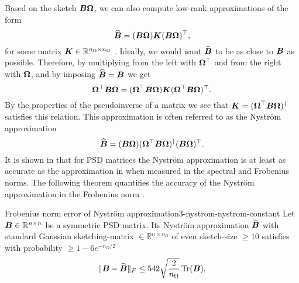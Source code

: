 Based on the sketch $\boldsymbol{B}\boldsymbol{\Omega}$, we can also compute low-rank approximations
of the form
\begin{equation}
    \widehat{\boldsymbol{B}} = (\boldsymbol{B} \boldsymbol{\Omega}) \boldsymbol{K} (\boldsymbol{B} \boldsymbol{\Omega})^{\top},
    \label{equ:3-nystrom-nystrom-general}
\end{equation}
for some matrix $\boldsymbol{K} \in \mathbb{R}^{n_{\Omega} \times n_{\Omega}}$ \cite[section~3.1]{lin2017randomized}.
Ideally, we would want $\widehat{\boldsymbol{B}}$ to be as close to $\boldsymbol{B}$ as possible. Therefore, by multiplying 
from the left with $\boldsymbol{\Omega}^{\top}$ and from the right with $\boldsymbol{\Omega}$,
and by imposing $\widehat{\boldsymbol{B}} = \boldsymbol{B}$ we get
\begin{equation}
    \boldsymbol{\Omega}^{\top} \boldsymbol{B} \boldsymbol{\Omega} = (\boldsymbol{\Omega}^{\top} \boldsymbol{B} \boldsymbol{\Omega}) \boldsymbol{K} (\boldsymbol{\Omega}^{\top} \boldsymbol{B} \boldsymbol{\Omega})^{\top}.
    \label{equ:3-nystrom-nystrom-unknown}
\end{equation}
By the properties of the pseudoinverse of a matrix we see that
$\boldsymbol{K} = (\boldsymbol{\Omega}^{\top} \boldsymbol{B} \boldsymbol{\Omega})^{\dagger}$ satisfies this
relation.
This approximation is often referred to as the Nystr\"om approximation \cite{gittens2013nystrom}
\begin{equation}
    \widehat{\boldsymbol{B}} = (\boldsymbol{B} \boldsymbol{\Omega}) (\boldsymbol{\Omega}^{\top} \boldsymbol{B} \boldsymbol{\Omega})^{\dagger} (\boldsymbol{B} \boldsymbol{\Omega})^{\top}.
    \label{equ:3-nystrom-nystrom}
\end{equation}
It is shown in \cite[lemma~5.2]{tropp2023randomized} that for \gls{PSD} matrices
the Nystr\"om approximation is at least as accurate as the approximation in
 when measured in the spectral
and Frobenius norms. The following theorem quantifies the accuracy of the
Nystr\"om approximation in the Frobenius norm \cite[lemma~3.2]{persson2022hutch}.

\begin{theorem}{Frobenius norm error of Nystr\"om approximation}{3-nystrom-nystrom-constant}
    Let $\boldsymbol{B} \in \mathbb{R}^{n \times n}$ be a symmetric \gls{PSD} matrix. Its Nystr\"om approximation
    $\widehat{\boldsymbol{B}}$  with standard Gaussian
    \gls{sketching-matrix} $\in \mathbb{R}^{n \times n_{\Omega}}$ of even
    \gls{sketch-size} $\geq 10$
    satisfies with probability $\geq 1-6e^{-n_{\Omega}/2}$
    \begin{equation}
        \lVert \boldsymbol{B} - \widehat{\boldsymbol{B}} \rVert _F \leq 542\sqrt{\frac{2}{n_{\Omega}}} \operatorname{Tr}(\boldsymbol{B}).
    \end{equation}
\end{theorem}

